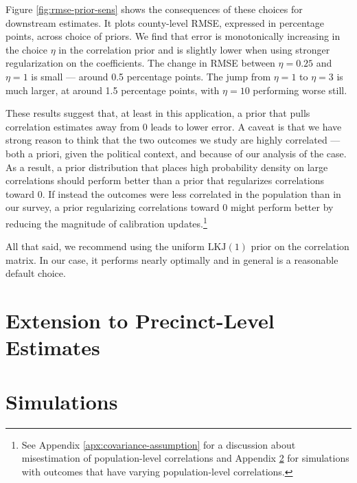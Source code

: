 Figure \ref{fig:rmse-prior-sens} shows the consequences of these choices for downstream estimates. 
It plots county-level RMSE, expressed in percentage points, across choice of priors. 
We find that error is monotonically increasing in the choice $\eta$ in the correlation prior and is slightly lower when using stronger regularization on the coefficients. 
The change in RMSE between $\eta = 0.25$ and $\eta = 1$ is small --- around 0.5 percentage points. 
The jump from $\eta = 1$ to $\eta = 3$ is much larger, at around 1.5 percentage points, with $\eta = 10$ performing worse still. 


These results suggest that, at least in this application, a prior that pulls correlation estimates away from 0 leads to lower error. 
A caveat is that we have strong reason to think that the two outcomes we study are highly correlated --- both a priori, given the political context, and because of our analysis of the case.
As a result, a prior distribution that places high probability density on large correlations should perform better than a prior that regularizes correlations toward 0. 
If instead the outcomes were less correlated in the population than in our survey, a prior regularizing correlations toward 0 might perform better by reducing the magnitude of calibration updates.\footnote{See Appendix \ref{apx:covariance-assumption} for a discussion about misestimation of population-level correlations and Appendix \ref{apx:simulations} for simulations with outcomes that have varying population-level correlations.}

All that said, we recommend using the uniform $\mathrm{LKJ}(1)$ prior on the correlation matrix.
In our case, it performs nearly optimally and in general is a reasonable default choice.



\clearpage
\section{Extension to Precinct-Level Estimates}
\label{apx:precinct}



\clearpage
\section{Simulations}
\label{apx:simulations}


